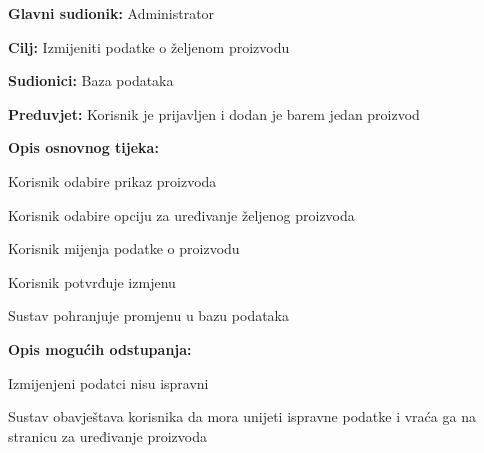 					\noindent {}
					\begin{packed_item}
						
						\item \textbf{Glavni sudionik:} Administrator
						\item  \textbf{Cilj:} Izmijeniti podatke o željenom proizvodu
						\item  \textbf{Sudionici:} Baza podataka
						\item  \textbf{Preduvjet:} Korisnik je prijavljen i dodan je barem jedan proizvod
						\item  \textbf{Opis osnovnog tijeka:}
						
						\item[] \begin{packed_enum}
							
							\item Korisnik odabire prikaz proizvoda
							\item Korisnik odabire opciju za uređivanje željenog proizvoda
							\item Korisnik mijenja podatke o proizvodu
							\item Korisnik potvrđuje izmjenu
							\item Sustav pohranjuje promjenu u bazu podataka
							
						\end{packed_enum}
						
						\item  \textbf{Opis mogućih odstupanja:}
						
						\item[] \begin{packed_item}
							
							\item[4.a] Izmijenjeni podatci nisu ispravni 
							\item[] \begin{packed_enum}
								
								\item Sustav obavještava korisnika da mora unijeti ispravne podatke i vraća ga na stranicu za uređivanje proizvoda
								
							\end{packed_enum}
							
						\end{packed_item}	
						
					\end{packed_item}
				
